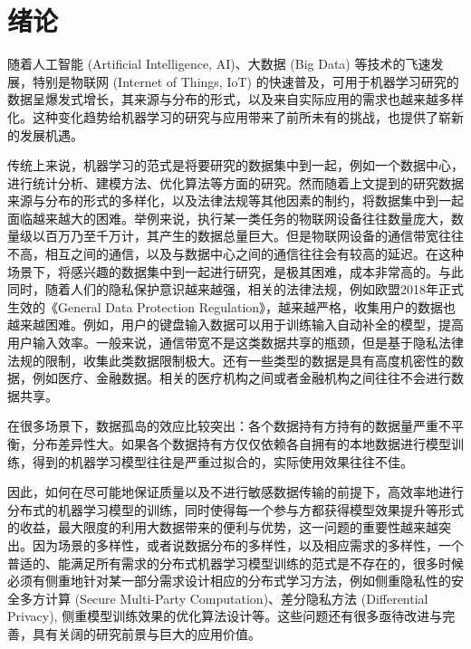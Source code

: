 \section{绪论}
\label{sec:chap1-introduction}


随着人工智能 (Artificial Intelligence, AI)、大数据 (Big Data) 等技术的飞速发展，特别是物联网 (Internet of Things, IoT) 的快速普及，可用于机器学习研究的数据呈爆发式增长，其来源与分布的形式，以及来自实际应用的需求也越来越多样化。这种变化趋势给机器学习的研究与应用带来了前所未有的挑战，也提供了崭新的发展机遇。

传统上来说，机器学习的范式是将要研究的数据集中到一起，例如一个数据中心，进行统计分析、建模方法、优化算法等方面的研究。然而随着上文提到的研究数据来源与分布的形式的多样化，以及法律法规等其他因素的制约，将数据集中到一起面临越来越大的困难。举例来说，执行某一类任务的物联网设备往往数量庞大，数量级以百万乃至千万计，其产生的数据总量巨大。但是物联网设备的通信带宽往往不高，相互之间的通信，以及与数据中心之间的通信往往会有较高的延迟。在这种场景下，将感兴趣的数据集中到一起进行研究，是极其困难，成本非常高的。与此同时，随着人们的隐私保护意识越来越强，相关的法律法规，例如欧盟2018年正式生效的《General Data Protection Regulation》，越来越严格，收集用户的数据也越来越困难\citep{Albrecht_2016}。例如，用户的键盘输入数据可以用于训练输入自动补全的模型，提高用户输入效率\citep{fl_keyboard}。一般来说，通信带宽不是这类数据共享的瓶颈，但是基于隐私法律法规的限制，收集此类数据限制极大。还有一些类型的数据是具有高度机密性的数据，例如医疗、金融数据。相关的医疗机构之间或者金融机构之间往往不会进行数据共享。

在很多场景下，数据孤岛的效应比较突出：各个数据持有方持有的数据量严重不平衡，分布差异性大。如果各个数据持有方仅仅依赖各自拥有的本地数据进行模型训练，得到的机器学习模型往往是严重过拟合的，实际使用效果往往不佳。

因此，如何在尽可能地保证质量以及不进行敏感数据传输的前提下，高效率地进行分布式的机器学习模型的训练，同时使得每一个参与方都获得模型效果提升等形式的收益，最大限度的利用大数据带来的便利与优势，这一问题的重要性越来越突出。因为场景的多样性，或者说数据分布的多样性，以及相应需求的多样性，一个普适的、能满足所有需求的分布式机器学习模型训练的范式是不存在的，很多时候必须有侧重地针对某一部分需求设计相应的分布式学习方法，例如侧重隐私性的安全多方计算 (Secure Multi-Party Computation)\cite{Bogetoft_2009_smpc}、差分隐私方法 (Differential Privacy)\citep{Dwork_2008_DP}, 侧重模型训练效果的优化算法设计\citep{boyd2011distributed}等。这些问题还有很多亟待改进与完善，具有关阔的研究前景与巨大的应用价值。
